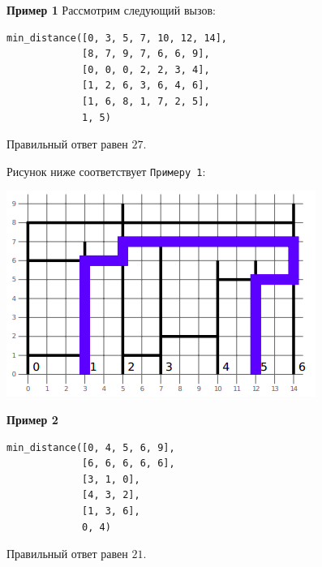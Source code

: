 \textbf{Пример 1}
Рассмотрим следующий вызов:

\begin{verbatim}
min_distance([0, 3, 5, 7, 10, 12, 14],
             [8, 7, 9, 7, 6, 6, 9],
             [0, 0, 0, 2, 2, 3, 4],
             [1, 2, 6, 3, 6, 4, 6],
             [1, 6, 8, 1, 7, 2, 5],
             1, 5)
\end{verbatim}

Правильный ответ равен $27$.

Рисунок ниже соответствует \texttt{Примеру 1}:

\includegraphics{1.png}

\textbf{Пример 2}

\begin{verbatim}
min_distance([0, 4, 5, 6, 9],
             [6, 6, 6, 6, 6],
             [3, 1, 0],
             [4, 3, 2],
             [1, 3, 6],
             0, 4)
\end{verbatim}

Правильный ответ равен $21$.